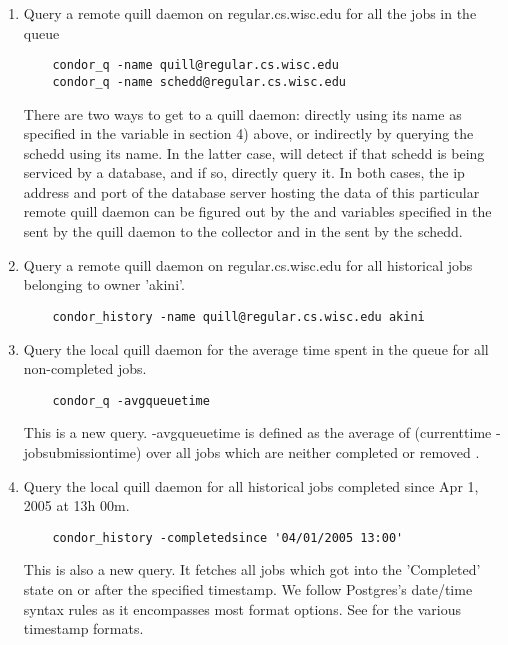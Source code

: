 \begin{enumerate}
\item Query a remote quill daemon on regular.cs.wisc.edu for all the jobs in 
the queue
\begin{verbatim}
	condor_q -name quill@regular.cs.wisc.edu
	condor_q -name schedd@regular.cs.wisc.edu

\end{verbatim}
There are two ways to get to a quill daemon: directly using its name as 
specified in the  variable in section 4) above, or indirectly
by querying the schedd using its name.  In the latter case,  will detect 
if that schedd is being serviced by a database, and if so, directly query it.
In both cases, the ip address and port of the database server hosting the data of 
this particular remote quill daemon can be figured out by the  
and  variables specified in the 
sent by the quill daemon to the collector and in the  sent by
the schedd.  

\item Query a remote quill daemon on regular.cs.wisc.edu for all historical 
jobs belonging to owner 'akini'.
\begin{verbatim}
	condor_history -name quill@regular.cs.wisc.edu akini
\end{verbatim}

\item Query the local quill daemon for the average time spent in the queue 
for all non-completed jobs. 
\begin{verbatim}
	condor_q -avgqueuetime 
\end{verbatim}
This is a new query.  -avgqueuetime is defined as the average of
(currenttime - jobsubmissiontime) over all jobs which are neither
completed  or removed .

\item Query the local quill daemon for all historical jobs completed since 
Apr 1, 2005 at 13h 00m.
\begin{verbatim}
	condor_history -completedsince '04/01/2005 13:00'
\end{verbatim}
This is also a new query.  It fetches all jobs
which got into the 'Completed' state on or after the
specified timestamp.  We follow Postgres's date/time
syntax rules as it encompasses most format options.  See
for the various timestamp formats.

\end{enumerate}


